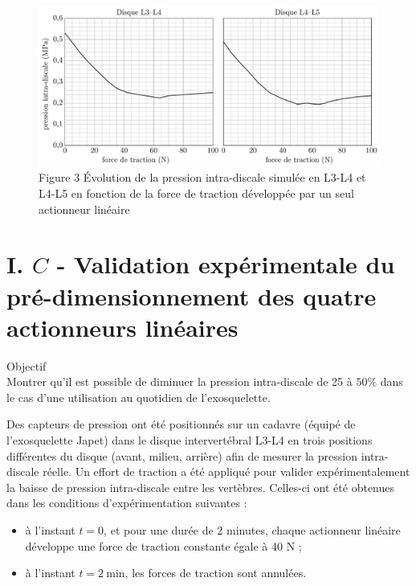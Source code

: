\documentclass[10pt]{article}
\begin{document}
\begin{figure}[h]
\begin{center}
  \includegraphics[width=\textwidth]{2025_09_16_5f2d7643f7e649c6833dg-02}
\captionsetup{labelformat=empty}
\caption{Figure 3 Évolution de la pression intra-discale simulée en L3-L4 et L4-L5 en fonction de la force de traction développée par un seul actionneur linéaire}
\end{center}
\end{figure}

\section{I. $C$ - Validation expérimentale du pré-dimensionnement des quatre actionneurs linéaires}
Objectif\\
Montrer qu'il est possible de diminuer la pression intra-discale de 25 à $50 \%$ dans le cas d'une utilisation au quotidien de l'exosquelette.

Des capteurs de pression ont été positionnés sur un cadavre (équipé de l'exosquelette Japet) dans le disque intervertébral L3-L4 en trois positions différentes du disque (avant, milieu, arrière) afin de mesurer la pression intra-discale réelle. Un effort de traction a été appliqué pour valider expérimentalement la baisse de pression intra-discale entre les vertèbres. Celles-ci ont été obtenues dans les conditions d'expérimentation suivantes :

\begin{itemize}
  \item à l'instant $t=0$, et pour une durée de 2 minutes, chaque actionneur linéaire développe une force de traction constante égale à 40 N ;
  \item à l'instant $t=2 \mathrm{~min}$, les forces de traction sont annulées.
\end{itemize}
\end{document}
